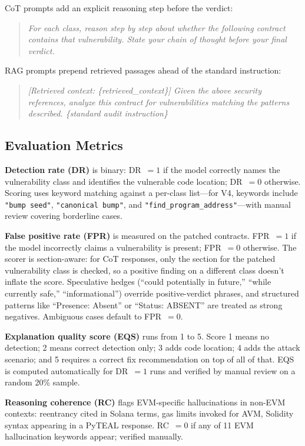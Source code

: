 \documentclass[journal]{IEEEtran}
\begin{document}
CoT prompts add an explicit reasoning step before the verdict:
\begin{quote}
\textit{For each class, reason step by step about whether the following contract
contains that vulnerability. State your chain of thought before your final
verdict.}
\end{quote}

RAG prompts prepend retrieved passages ahead of the standard instruction:
\begin{quote}
\textit{[Retrieved context: \{retrieved\_context\}]\newline
Given the above security references, analyze this contract for vulnerabilities
matching the patterns described. \{standard audit instruction\}}
\end{quote}

\subsection{Evaluation Metrics}

\textbf{Detection rate (DR)} is binary: DR~$= 1$ if the model correctly names
the vulnerability class and identifies the vulnerable code location;
DR~$= 0$ otherwise.
Scoring uses keyword matching against a per-class list---for V4, keywords
include \texttt{"bump seed"}, \texttt{"canonical bump"}, and
\texttt{"find\_program\_address"}---with manual review covering borderline
cases.

\textbf{False positive rate (FPR)} is measured on the patched contracts.
FPR~$= 1$ if the model incorrectly claims a vulnerability is present;
FPR~$= 0$ otherwise.
The scorer is section-aware: for CoT responses, only the section for the
patched vulnerability class is checked, so a positive finding on a different
class doesn't inflate the score.
Speculative hedges (``could potentially in future,'' ``while currently safe,''
``informational'') override positive-verdict phrases, and structured patterns
like ``Presence: Absent'' or ``Status: ABSENT'' are treated as strong negatives.
Ambiguous cases default to FPR~$= 0$.

\textbf{Explanation quality score (EQS)} runs from 1 to 5.
Score 1 means no detection; 2 means correct detection only; 3 adds code
location; 4 adds the attack scenario; and 5 requires a correct fix
recommendation on top of all of that.
EQS is computed automatically for DR~$= 1$ runs and verified by manual review
on a random 20\% sample.

\textbf{Reasoning coherence (RC)} flags EVM-specific hallucinations in
non-EVM contexts: reentrancy cited in Solana terms, gas limits invoked for
AVM, Solidity syntax appearing in a PyTEAL response.
RC~$= 0$ if any of 11 EVM hallucination keywords appear; verified manually.
\end{document}
